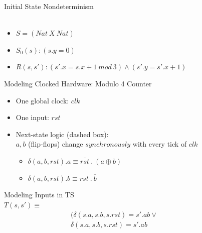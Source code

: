 \documentclass{beamer}
\begin{document}
\begin{frame}{Initial State Nondeterminism}
 \\
 \\
\begin{itemize}
\item<3-> $S = (Nat~X~Nat)$
\item<3-> $S_0(s): (s.y = 0)$
\item<3-> $R(s,s'): (s'.x = s.x+1~mod~3) \land (s'.y = s'.x + 1) $
\end{itemize}
\end{frame}

\begin{frame}{Modeling Clocked Hardware: Modulo 4 Counter}
\begin{itemize}
\item One global clock: $clk$ \\

\item One input: $rst$

\item Next-state logic (dashed box): \\
$a, b$ (flip-flops) change $synchronously$ with every tick of $clk$
\begin{itemize}
\item $\delta(a, b, rst).a \equiv \overline{rst}~.~(a \oplus b)$
\item $\delta(a, b, rst).b \equiv \overline{rst}~.~\overline{b}$
\end{itemize}


\end{itemize}
\end{frame}

\begin{frame}{Modeling Inputs in TS}
\hfill
{} \\
\hfill $T(s,s') \equiv$ \\
~~~~~~~~~~~~~~~~~~~$(\delta(s.a,s.b, s.rst) = s'.ab \lor$ \\
~~~~~~~~~~~~~~~~~~~$\delta(s.a,s.b,s.rst) = s'.ab$
\end{frame}
\end{document}
